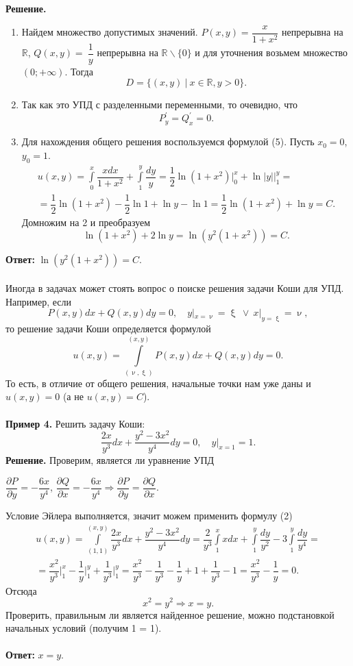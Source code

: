 \documentclass[a4paper, 12pt]{article}
\newcommand{\Rm}{\mathbb{R}}
\renewcommand{\d}{\partial}
\begin{document}
\textbf{Решение.} \begin{enumerate}
	\item Найдем множество допустимых значений. $P(x,y) = \dfrac{x}{1+x^2}$ непрерывна на $\Rm$, $Q(x,y) =~\dfrac{1}{y}$ непрерывна на $\Rm \backslash \{0\}$ и для уточнения возьмем множество $(0; +\infty)$. Тогда $$D = \{(x,y)\ |\ x\in \Rm, y > 0\}.$$
	\item Так как это УПД с разделенными переменными, то очевидно, что $$P^\prime_y = Q^\prime _x = 0.$$
	\item Для нахождения общего решения воспользуемся формулой (5). Пусть $x_0 = 0$, $y_0 = 1$.
	\begin{multline*}
		u(x,y) = \int\limits_0^x\dfrac{xdx}{1+x^2} + \int\limits_1^y\dfrac{dy}{y} = \dfrac{1}{2}\ln(1+x^2)\Big|_0^x + \ln|y|\Big|_1^y =\\= \dfrac{1}{2}\ln(1+x^2) - \dfrac{1}{2}\ln1 + \ln y - \ln1 = \dfrac{1}{2}\ln(1+x^2) + \ln y = C.
	\end{multline*}
Домножим на 2 и преобразуем $$\ln(1+x^2) + 2\ln y = \ln (y^2(1+ x^2)) = C.$$
\end{enumerate}
\textbf{Ответ:} $\ln (y^2(1+ x^2)) = C.$\\\\
Иногда в задачах может стоять вопрос о поиске решения задачи Коши для УПД. Например, если $$P(x,y)dx + Q(x,y)dy = 0,\quad y|_{x=\upnu} = \upxi\ \lor\ x|_{y=\upxi}=\upnu,$$
то решение задачи Коши определяется формулой $$u(x,y) = \int\limits^{(x,y)}_{(\upnu,\upxi)}P(x,y)dx + Q(x,y)dy = 0.$$
То есть, в отличие от общего решения, начальные точки нам уже даны и $u(x,y) = 0$ (а не $u(x,y) = C$).\\\\
\textbf{Пример 4.} Решить задачу Коши:
$$\dfrac{2x}{y^3}dx + \dfrac{y^2 - 3x^2}{y^4}dy = 0,\quad y|_{x=1} = 1.$$
\textbf{Решение.} Проверим, является ли уравнение УПД\begin{center}
	$\dfrac{\d P}{\d y} = -\dfrac{6x}{y^4}$, $\dfrac{\d Q}{\d x} = -\dfrac{6x}{y^4} \Rightarrow \dfrac{\d P}{\d y} = \dfrac{\d Q}{\d x}$.\end{center}
	Условие Эйлера выполняется, значит можем применить формулу (2)
	\begin{multline*}
	u(x,y) = \int\limits^{(x,y)}_{(1,1)} \dfrac{2x}{y^3}dx + \dfrac{y^2 - 3x^2}{y^4}dy = \dfrac{2}{y^3}\int\limits_1^xxdx + \int\limits_1^y\dfrac{dy}{y^2} - 3 \int\limits_1^y\dfrac{dy}{y^4} =\\= \dfrac{x^2}{y^3}\Big|_1^x - \dfrac{1}{y}\Big|_1^y + \dfrac{1}{y^3}\Big|_1^y =\dfrac{x^2}{y^3} - \dfrac{1}{y^3} - \dfrac{1}{y} + 1 + \dfrac{1}{y^3} - 1 = \dfrac{x^2}{y^3} - \dfrac{1}{y} = 0.
\end{multline*}
Отсюда $$x^2 = y^2 \Rightarrow x = y.$$
Проверить, правильным ли является найденное решение, можно подстановкой начальных условий (получим 1 = 1).\\\\
\textbf{Ответ:} $x = y.$
\end{document}
